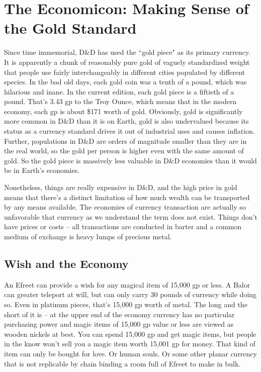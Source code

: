 \chapter{The Economicon: Making Sense of the Gold Standard}
\vspace*{-10pt}

Since time immemorial, D\&D has used the ``gold piece" as its primary currency. It is apparently a chunk of reasonably pure gold of vaguely standardized weight that people use fairly interchangeably in different cities populated by different species. In the bad old days, each gold coin was a tenth of a pound, which was hilarious and inane. In the current edition, each gold piece is a fiftieth of a pound. That's 3.43 gp to the Troy Ounce, which means that in the modern economy, each gp is about \$171 worth of gold. Obviously, gold is significantly more common in D\&D than it is on Earth, gold is also undervalued because its status as a currency standard drives it out of industrial uses and causes inflation. Further, populations in D\&D are orders of magnitude smaller than they are in the real world, so the gold per person is higher even with the same amount of gold. So the gold piece is massively less valuable in D\&D economies than it would be in Earth's economies.

Nonetheless, things are really expensive in D\&D, and the high price in gold means that there's a distinct limitation of how much wealth can be transported by any means available. The economies of currency transaction are actually so unfavorable that currency as we understand the term does not exist. Things don't have prices or costs -- all transactions are conducted in barter and a common medium of exchange is heavy lumps of precious metal.

\section{Wish and the Economy}

An Efreet can provide a wish for any magical item of 15,000 gp or less. A Balor can greater teleport at will, but can only carry 30 pounds of currency while doing so. Even in platinum pieces, that's 15,000 gp worth of metal. The long and the short of it is -- at the upper end of the economy currency has no particular purchasing power and magic items of 15,000 gp value or less are viewed as wooden nickels at best. You can spend 15,000 gp and get magic items, but people in the know won't sell you a magic item worth 15,001 gp for money. That kind of item can only be bought for love. Or human souls. Or some other planar currency that is not replicable by chain binding a room full of Efreet to make in bulk.

